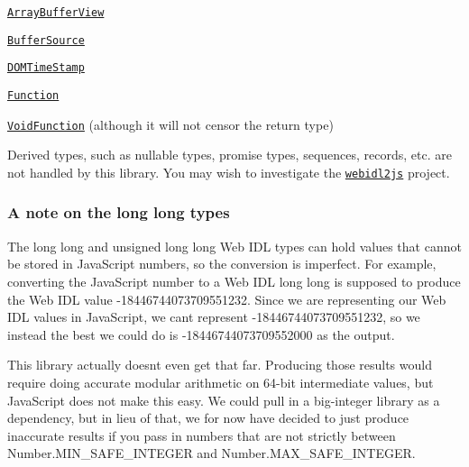 \begin{DoxyItemize}
\item \href{https://heycam.github.io/webidl/#ArrayBufferView}{\tt {\ttfamily Array\+Buffer\+View}}
\item \href{https://heycam.github.io/webidl/#BufferSource}{\tt {\ttfamily Buffer\+Source}}
\item \href{https://heycam.github.io/webidl/#DOMTimeStamp}{\tt {\ttfamily D\+O\+M\+Time\+Stamp}}
\item \href{https://heycam.github.io/webidl/#Function}{\tt {\ttfamily Function}}
\item \href{https://heycam.github.io/webidl/#VoidFunction}{\tt {\ttfamily Void\+Function}} (although it will not censor the return type)
\end{DoxyItemize}

Derived types, such as nullable types, promise types, sequences, records, etc. are not handled by this library. You may wish to investigate the \href{https://github.com/jsdom/webidl2js}{\tt webidl2js} project.

\subsubsection*{A note on the {\ttfamily long long} types}

The {\ttfamily long long} and {\ttfamily unsigned long long} Web I\+DL types can hold values that cannot be stored in Java\+Script numbers, so the conversion is imperfect. For example, converting the Java\+Script number {} to a Web I\+DL {\ttfamily long long} is supposed to produce the Web I\+DL value {\ttfamily -\/18446744073709551232}. Since we are representing our Web I\+DL values in Java\+Script, we can\textquotesingle{}t represent {\ttfamily -\/18446744073709551232}, so we instead the best we could do is {\ttfamily -\/18446744073709552000} as the output.

This library actually doesn\textquotesingle{}t even get that far. Producing those results would require doing accurate modular arithmetic on 64-\/bit intermediate values, but Java\+Script does not make this easy. We could pull in a big-\/integer library as a dependency, but in lieu of that, we for now have decided to just produce inaccurate results if you pass in numbers that are not strictly between {\ttfamily Number.\+M\+I\+N\+\_\+\+S\+A\+F\+E\+\_\+\+I\+N\+T\+E\+G\+ER} and {\ttfamily Number.\+M\+A\+X\+\_\+\+S\+A\+F\+E\+\_\+\+I\+N\+T\+E\+G\+ER}.

